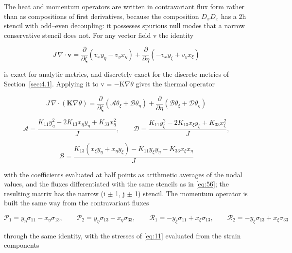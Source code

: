 \documentclass[preprint,12pt]{elsarticle}
\begin{document}
The heat and momentum operators are written in contravariant flux form rather than as compositions of first derivatives, because the composition $D_{x}D_{x}$ has a 2h stencil with odd--even decoupling: it possesses spurious null modes that a narrow conservative stencil does not. For any vector field v the identity

\begin{equation}
J\,\nabla\cdot\mathbf{v}=\frac{\partial}{\partial\xi}\left(v_xy_\eta-v_yx_\eta\right)+\frac{\partial}{\partial\eta}\left(-v_xy_\xi+v_yx_\xi\right) 
\label{eq:57}
\end{equation}

is exact for analytic metrics, and discretely exact for the discrete metrics of Section~\ref{sec:4.1}. Applying it to v = $-$K$\nabla \theta$ gives the thermal operator

\begin{equation}
J\,\nabla\cdot\left(\mathbf{K}\nabla\theta\right)=\frac{\partial}{\partial\xi}\left(\mathcal{A}\theta_\xi+\mathcal{B}\theta_\eta\right)+\frac{\partial}{\partial\eta}\left(\mathcal{B}\theta_\xi+\mathcal{D}\theta_\eta\right) 
\label{eq:58}
\end{equation}

\begin{equation}
\mathcal{A}=\frac{K_{11}y_\eta^2-2K_{13}x_\eta y_\eta+K_{33}x_\eta^2}{J},\qquad \mathcal{D}=\frac{K_{11}y_\xi^2-2K_{13}x_\xi y_\xi+K_{33}x_\xi^2}{J}, 
\label{eq:59}
\end{equation}

\begin{equation}
\mathcal{B}=\frac{K_{13}\left(x_\xi y_\eta+x_\eta y_\xi\right)-K_{11}y_\xi y_\eta-K_{33}x_\xi x_\eta}{J} 
\label{eq:60}
\end{equation}

with the coefficients evaluated at half points as arithmetic averages of the nodal values, and the fluxes differentiated with the same stencils as in \eqref{eq:56}; the resulting matrix has the narrow (i $\pm$ 1, j $\pm$ 1) stencil. The momentum operator is built the same way from the contravariant fluxes

\begin{equation}
\mathcal{P}_1=y_\eta\sigma_{11}-x_\eta\sigma_{13},\qquad \mathcal{P}_2=y_\eta\sigma_{13}-x_\eta\sigma_{33},\qquad \mathcal{R}_1=-y_\xi\sigma_{11}+x_\xi\sigma_{13},\qquad \mathcal{R}_2=-y_\xi\sigma_{13}+x_\xi\sigma_{33} 
\label{eq:61}
\end{equation}

through the same identity, with the stresses of \eqref{eq:11} evaluated from the strain components
\end{document}
